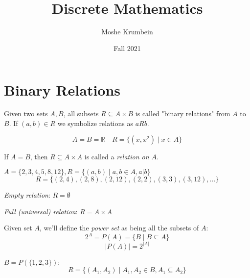 \documentclass[00_complete]{subfiles}
\title{Discrete Mathematics}
\author{Moshe Krumbein}
\date{Fall 2021}
\begin{document}

\section{Binary Relations}
\begin{definition}
Given two sets $A, B$, all subsets $R \subseteq A \times B$ is called "binary
relations" from $A$ to $B$. If $(a,b) \in R$ we symbolize relations as $aRb$.
\end{definition}

\begin{example}
$$A=B=\mathbb{R} \quad R=\{(x,x^2) \mid x \in A \}$$
\end{example}

\begin{definition}
If $A=B$, then $R \subseteq A \times A$ is called a \emph{relation on $A$}.
\end{definition}

\begin{example}
$A=\{2,3,4,5,8,12\}, R=\{(a,b) \mid a, b \in A, a | b \}$
$$R=\{(2,4), (2,8),(2,12),(2,2),(3,3),(3,12),\ldots \}$$
\end{example}

\begin{definition}
\emph{Empty relation}: $R=\emptyset$
\end{definition}
\begin{definition}
\emph{Full (universal) relation}: $R = A \times A$
\end{definition}
\begin{definition}
Given set $A$, we'll define the \emph{power set} as being all the subsets of $A$:
$$2^A = P(A) = \{B \mid B \subseteq A \}$$
$$|P(A)| = 2^{|A|}$$
\end{definition}
\begin{example}
$B = P(\{1,2,3\})$:
$$R=\{(A_1,A_2) \mid A_1, A_2 \in B, A_1 \subseteq A_2 \}$$
\end{example}
\end{document}
